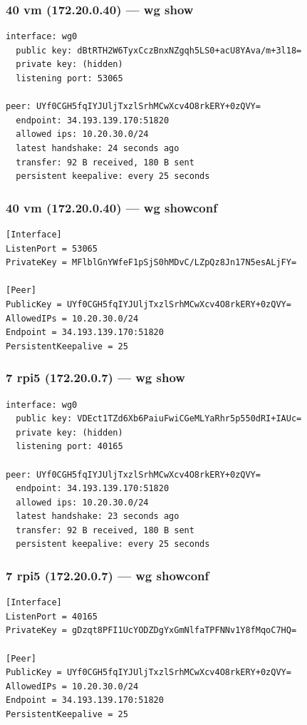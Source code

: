 \documentclass[11pt,a4paper]{article}
\begin{document}
\subsubsection*{40 vm (172.20.0.40) — wg show}
\begin{lstlisting}
interface: wg0
  public key: dBtRTH2W6TyxCczBnxNZgqh5LS0+acU8YAva/m+3l18=
  private key: (hidden)
  listening port: 53065

peer: UYf0CGH5fqIYJUljTxzlSrhMCwXcv4O8rkERY+0zQVY=
  endpoint: 34.193.139.170:51820
  allowed ips: 10.20.30.0/24
  latest handshake: 24 seconds ago
  transfer: 92 B received, 180 B sent
  persistent keepalive: every 25 seconds

\end{lstlisting}

\subsubsection*{40 vm (172.20.0.40) — wg showconf}
\begin{lstlisting}
[Interface]
ListenPort = 53065
PrivateKey = MFlblGnYWfeF1pSjS0hMDvC/LZpQz8Jn17N5esALjFY=

[Peer]
PublicKey = UYf0CGH5fqIYJUljTxzlSrhMCwXcv4O8rkERY+0zQVY=
AllowedIPs = 10.20.30.0/24
Endpoint = 34.193.139.170:51820
PersistentKeepalive = 25

\end{lstlisting}

\subsubsection*{7 rpi5 (172.20.0.7) — wg show}
\begin{lstlisting}
interface: wg0
  public key: VDEct1TZd6Xb6PaiuFwiCGeMLYaRhr5p550dRI+IAUc=
  private key: (hidden)
  listening port: 40165

peer: UYf0CGH5fqIYJUljTxzlSrhMCwXcv4O8rkERY+0zQVY=
  endpoint: 34.193.139.170:51820
  allowed ips: 10.20.30.0/24
  latest handshake: 23 seconds ago
  transfer: 92 B received, 180 B sent
  persistent keepalive: every 25 seconds

\end{lstlisting}

\subsubsection*{7 rpi5 (172.20.0.7) — wg showconf}
\begin{lstlisting}
[Interface]
ListenPort = 40165
PrivateKey = gDzqt8PFI1UcYODZDgYxGmNlfaTPFNNv1Y8fMqoC7HQ=

[Peer]
PublicKey = UYf0CGH5fqIYJUljTxzlSrhMCwXcv4O8rkERY+0zQVY=
AllowedIPs = 10.20.30.0/24
Endpoint = 34.193.139.170:51820
PersistentKeepalive = 25

\end{lstlisting}
\end{document}
